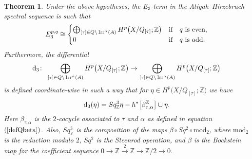 \documentclass[10pt,a4paper]{amsart}
\def\Z{\mathbb{Z}}
\DeclareMathOperator{\Irr}{\textup{Irr}}
\newtheorem{Th}{Theorem}[section]
\theoremstyle{definition}
\numberwithin{equation}{section}
\begin{document}
\begin{Th}
Under the above hypotheses, the $E_{3}$-term in the Atiyah--Hirzebruch spectral sequence is such that
\begin{gather*}
E_{3}^{p,q} \cong
\begin{cases}
\bigoplus_{[\tau]\in Q \backslash \Irr^{\alpha}(A)}H^{p}\big(X/Q_{[\tau]};\Z\big) &\text{if}\quad q
\ \text{is even},
\\
0& \text{if}\quad q\ \text{is odd}.
\end{cases}
\end{gather*}
Furthermore, the differential
\begin{gather*}
{\rm d}_{3}\colon\ \bigoplus_{[\tau]\in Q \backslash \Irr^{\alpha}(A)}H^{p}\big(X/Q_{[\tau]};\Z\big) \to
\bigoplus_{[\tau]\in Q \backslash \Irr^{\alpha}(A)}H^{p}\big(X/Q_{[\tau]};\Z\big)
\end{gather*}
is defined coordinate-wise in such a way that for $\eta\in H^{p}\big(X/Q_{[\tau]};\Z\big)$ we have
\begin{gather*}
{\rm d}_3(\eta) = Sq^3_\Z \eta - h^*\big[\beta_{\tau,\alpha}^{\Z}\big] \cup \eta.
\end{gather*}
Here $\beta_{\tau,\alpha}$ is the $2$-cocycle associated to $\tau$ and $\alpha$ as defined in equation~$(\ref{defQbeta})$. Also, $Sq^3_\Z$ is the composition of the maps $\beta \circ Sq^2 \circ \text{mod}_2$, where $\text{mod}_2$
is the reduction modulo $2$, $Sq^2$ is the Steenrod operation, and $\beta$ is the Bockstein map for the coefficient sequence
$0\to\Z \xrightarrow{2}\Z \to \Z/2\to 0$.
\end{Th}
\end{document}
